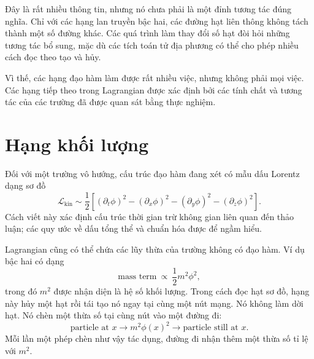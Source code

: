 Đây là rất nhiều thông tin, nhưng nó chưa phải là một đỉnh tương tác đúng nghĩa. Chỉ với các hạng lan truyền bậc hai, các đường hạt liên thông không tách thành một số đường khác. Các quá trình làm thay đổi số hạt đòi hỏi những tương tác bổ sung, mặc dù các tích toán tử địa phương có thể cho phép nhiều cách đọc theo tạo và hủy.

\begin{classroomqa}
\end{classroomqa}


Vì thế, các hạng đạo hàm làm được rất nhiều việc, nhưng không phải mọi việc. Các hạng tiếp theo trong Lagrangian được xác định bởi các tính chất và tương tác của các trường đã được quan sát bằng thực nghiệm.

\section{Hạng khối lượng}

Đối với một trường vô hướng, cấu trúc đạo hàm đang xét có mẫu dấu Lorentz dạng sơ đồ
\begin{equation}
\mathcal{L}_{\mathrm{kin}}
\sim
\frac{1}{2}\left[
(\partial_t\phi)^2
-(\partial_x\phi)^2
-(\partial_y\phi)^2
-(\partial_z\phi)^2
\right].
\end{equation}
Cách viết này xác định cấu trúc thời gian trừ không gian liên quan đến thảo luận; các quy ước về dấu tổng thể và chuẩn hóa được để ngầm hiểu.

Lagrangian cũng có thể chứa các lũy thừa của trường không có đạo hàm. Ví dụ bậc hai có dạng
\begin{equation}
\text{mass term}\ \propto\ \frac{1}{2}m^2\phi^2,
\end{equation}
trong đó \(m^2\) được nhận diện là hệ số khối lượng. Trong cách đọc hạt sơ đồ, hạng này hủy một hạt rồi tái tạo nó ngay tại cùng một nút mạng. Nó không làm dời hạt. Nó chèn một thừa số tại cùng nút vào một đường đi:
\begin{equation}
\text{particle at }x
\longrightarrow
\boxed{m^2\phi(x)^2}
\longrightarrow
\text{particle still at }x.
\end{equation}
Mỗi lần một phép chèn như vậy tác dụng, đường đi nhận thêm một thừa số tỉ lệ với \(m^2\).

